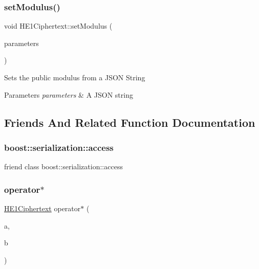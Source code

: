 \subsubsection{\texorpdfstring{set\+Modulus()}{setModulus()}\hspace{0.1cm}{\footnotesize\ttfamily [2/2]}}
{\footnotesize\ttfamily void H\+E1\+Ciphertext\+::set\+Modulus (\begin{DoxyParamCaption}\item[{std\+::string \&}]{parameters }\end{DoxyParamCaption})\hspace{0.3cm}{\ttfamily [static]}}

Sets the public modulus from a J\+S\+ON String 
\begin{DoxyParams}{Parameters}
{\em parameters} & A J\+S\+ON string \\
\hline
\end{DoxyParams}


\subsection{Friends And Related Function Documentation}
\mbox{\label{classHE1Ciphertext_ac98d07dd8f7b70e16ccb9a01abf56b9c}} 
\subsubsection{\texorpdfstring{boost\+::serialization\+::access}{boost::serialization::access}}
{\footnotesize\ttfamily friend class boost\+::serialization\+::access\hspace{0.3cm}{\ttfamily [friend]}}

\mbox{\label{classHE1Ciphertext_a8b5554bdd70338b6c916db1423702314}} 
\subsubsection{\texorpdfstring{operator$\ast$}{operator*}}
{\footnotesize\ttfamily \hyperlink{classHE1Ciphertext}{H\+E1\+Ciphertext} operator$\ast$ (\begin{DoxyParamCaption}\item[{const \hyperlink{classHE1Ciphertext}{H\+E1\+Ciphertext} \&}]{a,  }\item[{const \hyperlink{classHE1Ciphertext}{H\+E1\+Ciphertext} \&}]{b }\end{DoxyParamCaption})\hspace{0.3cm}{\ttfamily [friend]}}

